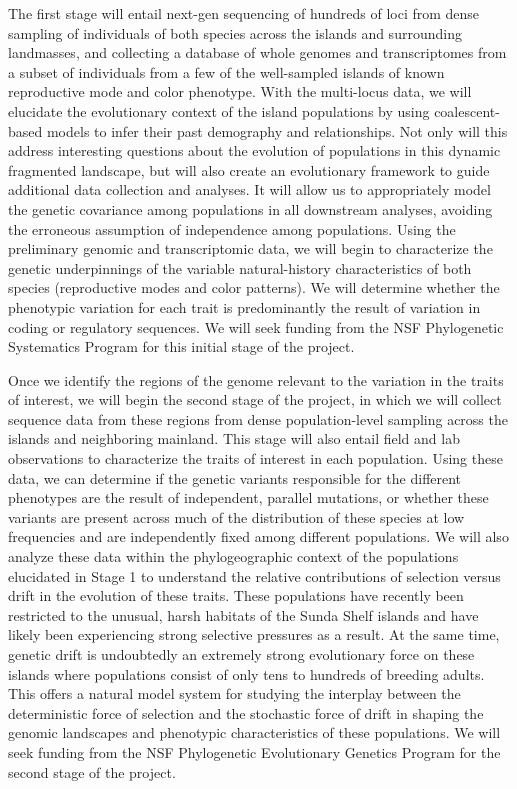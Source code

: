 \documentclass[10pt]{article}
\begin{document}
The first stage will entail next-gen sequencing of hundreds of loci from dense
sampling of individuals of both species across the islands and surrounding
landmasses, and collecting a database of whole genomes and transcriptomes from
a subset of individuals from a few of the well-sampled islands of known
reproductive mode and color phenotype.
With the multi-locus data, we will elucidate the evolutionary context of the
island populations by using coalescent-based models to infer their past
demography and relationships.
Not only will this address interesting questions about the evolution of
populations in this dynamic fragmented landscape, but will also create an
evolutionary framework to guide additional data collection and analyses.
It will allow us to appropriately model the genetic covariance among
populations in all downstream analyses, avoiding the erroneous assumption of
independence among populations.
Using the preliminary genomic and transcriptomic data, we will begin to
characterize the genetic underpinnings of the variable natural-history
characteristics of both species (reproductive modes and color patterns).
We will determine whether the phenotypic variation for each trait is
predominantly the result of variation in coding or regulatory sequences.
We will seek funding from the NSF Phylogenetic Systematics Program for this
initial stage of the project.

Once we identify the regions of the genome relevant to the variation in the
traits of interest, we will begin the second stage of the project, in which we
will collect sequence data from these regions from dense population-level
sampling across the islands and neighboring mainland.
This stage will also entail field and lab observations to characterize the
traits of interest in each population.
Using these data, we can determine if the genetic variants responsible for the
different phenotypes are the result of independent, parallel mutations, or
whether these variants are present across much of the distribution of these
species at low frequencies and are independently fixed among different
populations.
We will also analyze these data within the phylogeographic context of the
populations elucidated in Stage 1 to understand the relative contributions of
selection versus drift in the evolution of these traits.
These populations have recently been restricted to the unusual, harsh habitats
of the Sunda Shelf islands and have likely been experiencing strong selective
pressures as a result.
At the same time, genetic drift is undoubtedly an extremely strong evolutionary
force on these islands where populations consist of only tens to hundreds of
breeding adults.
This offers a natural model system for studying the interplay between the
deterministic force of selection and the stochastic force of drift in shaping
the genomic landscapes and phenotypic characteristics of these populations.
We will seek funding from the NSF Phylogenetic Evolutionary Genetics Program
for the second stage of the project.
\end{document}

